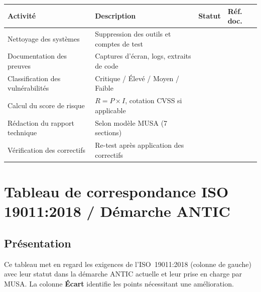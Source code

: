 \documentclass[12pt,a4paper,oneside]{report}
\begin{document}
\begin{longtable}{|p{5cm}|p{6cm}|p{1.5cm}|p{1.5cm}|}
\hline
\rowcolor{theadcolor}
\color{white}\textbf{Activité} &
\color{white}\textbf{Description} &
\color{white}\textbf{Statut} &
\color{white}\textbf{Réf. doc.} \\
\hline\endhead\hline\endfoot
\rowcolor{trow1}
Nettoyage des systèmes &
  Suppression des outils et comptes de test & & \\
\hline\rowcolor{trow2}
Documentation des preuves &
  Captures d'écran, logs, extraits de code & & \\
\hline\rowcolor{trow1}
Classification des vulnérabilités &
  Critique / Élevé / Moyen / Faible & & \\
\hline\rowcolor{trow2}
Calcul du score de risque &
  $R = P \times I$, cotation CVSS si applicable & & \\
\hline\rowcolor{trow1}
Rédaction du rapport technique &
  Selon modèle MUSA (7 sections) & & \\
\hline\rowcolor{trow2}
Vérification des correctifs &
  Re-test après application des correctifs & & \\
\hline
\end{longtable}

\newpage

\chapter{Tableau de correspondance ISO 19011:2018 / Démarche ANTIC}
\label{annexe:iso19011}

\section*{Présentation}

Ce tableau met en regard les exigences de l'ISO~19011:2018 (colonne de gauche)
avec leur statut dans la démarche ANTIC actuelle et leur prise en charge par MUSA.
La colonne \textbf{Écart} identifie les points nécessitant une amélioration.
\end{document}
